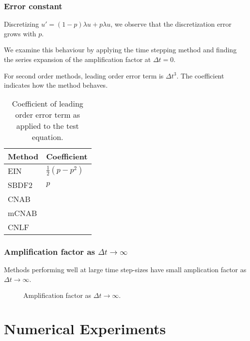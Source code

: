 \documentclass[hyperref={pdfpagelabels=false}]{beamer}
\begin{document}
\begin{frame}
	\frametitle{Error constant}
	Discretizing $u' = (1- p)\lambda u + p\lambda u$, we observe that the discretization error grows with $p$.
	
	We examine this behaviour by applying the time stepping method and finding the series expansion of the amplification factor at $\Delta t=0$. 
	
	For second order methods, leading order error term is $\Delta t^3$. The coefficient indicates how the method behaves. 
	\begin{table}[b]
		\centering 
		\caption{Coefficient of leading order error term as applied to the test equation.}
		\begin{tabular}{ll} 
			\toprule 
	Method & Coefficient 
\\ \midrule 
EIN & $\frac{1}{2}(p-p^2)$ 
\\
SBDF2 & $p$
\\ 
CNAB 
\\ 
mCNAB 
\\ 
CNLF 
\\ \bottomrule
		\end{tabular}
	\end{table}
\end{frame}
\begin{frame}
	\frametitle{Amplification factor as $\Delta t\to\infty$}
	Methods performing well at large time step-sizes have small amplication factor as $\Delta t \to \infty$. 
	
	\begin{figure}
		\centering 
\caption{Amplification factor as $\Delta t \to \infty$.}
	\end{figure}
\end{frame}

\section{Numerical Experiments}
\end{document}
